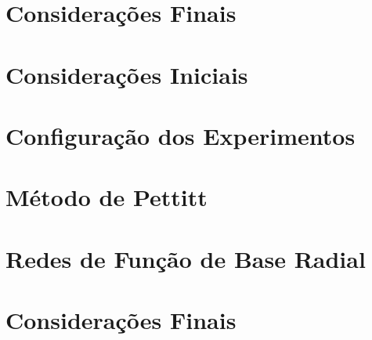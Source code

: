 \documentclass[qual, classic, a4paper]{ufbathesis}
\begin{document}
\section{Considerações Finais}
\blindtext

 \label{experimentos_iniciais}
\section{Considerações Iniciais}
\blindtext

\section{Configuração dos Experimentos}
\blindtext

\section{Método de Pettitt}
\blindtext

\section{Redes de Função de Base Radial}
\blindtext

\section{Considerações Finais}
\blindtext


\backmatter





%
% 
% 

\end{document}
